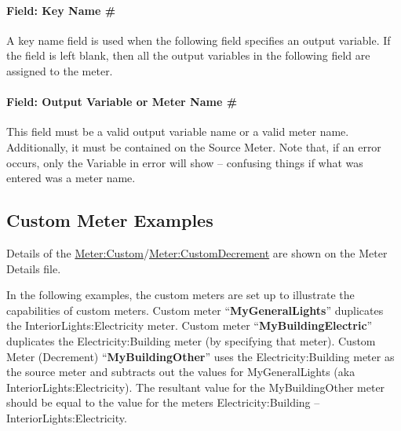 \paragraph{Field: Key Name \#}\label{field-key-name-1}

A key name field is used when the following field specifies an output variable. If the field is left blank, then all the output variables in the following field are assigned to the meter.

\paragraph{Field: Output Variable or Meter Name \#}\label{field-output-variable-or-meter-name-1}

This field must be a valid output variable name or a valid meter name. Additionally, it must be contained on the Source Meter. Note that, if an error occurs, only the Variable in error will show -- confusing things if what was entered was a meter name.

\subsection{Custom Meter Examples}\label{custom-meter-examples}

Details of the \hyperref[metercustom]{Meter:Custom}/\hyperref[metercustomdecrement]{Meter:CustomDecrement} are shown on the Meter Details file.

In the following examples, the custom meters are set up to illustrate the capabilities of custom meters. Custom meter ``\textbf{MyGeneralLights}'' duplicates the InteriorLights:Electricity meter. Custom meter ``\textbf{MyBuildingElectric}'' duplicates the Electricity:Building meter (by specifying that meter). Custom Meter (Decrement) ``\textbf{MyBuildingOther}'' uses the Electricity:Building meter as the source meter and subtracts out the values for MyGeneralLights (aka InteriorLights:Electricity). The resultant value for the MyBuildingOther meter should be equal to the value for the meters Electricity:Building -- InteriorLights:Electricity.

